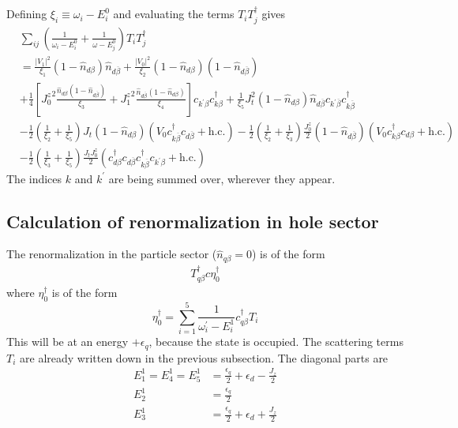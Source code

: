 \documentclass[twoside,11pt]{report}
\numberwithin{equation}{section}
\begin{document}
\\\\Defining \(\xi_i \equiv \omega_i - E_i^0\) and evaluating the terms \(T_i T_j^\dagger\) gives
\begin{equation}\begin{aligned}
	&\sum_{ij} \left(\frac{1}{\omega_i - E^0_i} + \frac{1}{\omega - E^0_j}\right) T_i T_j^\dagger\\ 
	&=\frac{|V_1|^2}{\xi_1}\left( 1 - \hat n_{d\beta} \right) \hat n_{d\overline\beta} + \frac{|V_0|^2}{\xi_2}\left( 1 - \hat n_{d\beta} \right) \left( 1 - \hat n_{d\overline\beta} \right) \\
	&+ \frac{1}{4}\left[ {J_0^z}^2\frac{\hat n_{d\beta}\left( 1 - \hat n_{d\overline\beta} \right) }{\xi_3} + {J_1^z}^2\frac{\hat n_{d\overline\beta}\left( 1 - \hat n_{d\beta} \right)}{\xi_4} \right]c_{k^\prime\beta}c^\dagger_{k\beta} + \frac{1}{\xi_5}J_t^2 \left( 1 - \hat n_{d\beta} \right) \hat n_{d\overline\beta} c_{k^\prime\overline\beta}c^\dagger_{k\overline\beta} \\
	&- \frac{1}{2} \left(\frac{1}{\xi_2} + \frac{1}{\xi_5}\right)J_t\left( 1 - \hat n_{d\beta}\right) \left(V_0 c^\dagger_{k\overline\beta}c_{d\overline\beta} + \text{h.c.}\right) - \frac{1}{2}\left(\frac{1}{\xi_2} + \frac{1}{\xi_3}\right)\frac{J^z_0}{2}\left(1 - \hat n_{d\overline\beta}\right)\left(V_0 c^\dagger_{k\beta}c_{d\beta} + \text{h.c.}\right) \\
	&-\frac{1}{2}\left(\frac{1}{\xi_3} + \frac{1}{\xi_5}\right)\frac{J_t J^z_0}{2}\left(c^\dagger_{d\beta}c_{d\overline\beta}c^\dagger_{k\overline\beta}c_{k^\prime\beta} + \text{h.c.}\right)
\end{aligned}\end{equation}
The indices \(k\) and \(k^\prime\) are being summed over, wherever they appear.
\subsection{Calculation of renormalization in hole sector}
The renormalization in the particle sector (\(\hat n_{q\beta}=0\)) is of the form
\begin{equation}\begin{aligned}
	T^\dagger_{q\beta}c \eta_0^\dagger
\end{aligned}\end{equation}
where \(\eta_0^\dagger\) is of the form
\begin{equation}
	\eta_0^\dagger = \sum_{i=1}^5\frac{1}{\omega^\prime_i - E_i^1}c^\dagger_{q\beta} T_i
\end{equation}
This will be at an energy \(+\epsilon_q\), because the state is occupied. The scattering terms \(T_i\) are already written down in the previous subsection. The diagonal parts are
\begin{equation}\begin{aligned}
	E^1_1 = E^1_4 = E^1_5 &= \frac{\epsilon_q}{2} + \epsilon_d - \frac{J_z}{2}\\
	E^1_2 &= \frac{\epsilon_q}{2}\\
	E^1_3 &= \frac{\epsilon_q}{2} + \epsilon_d + \frac{J_z}{2} \\
\end{aligned}\end{equation}
\end{document}
